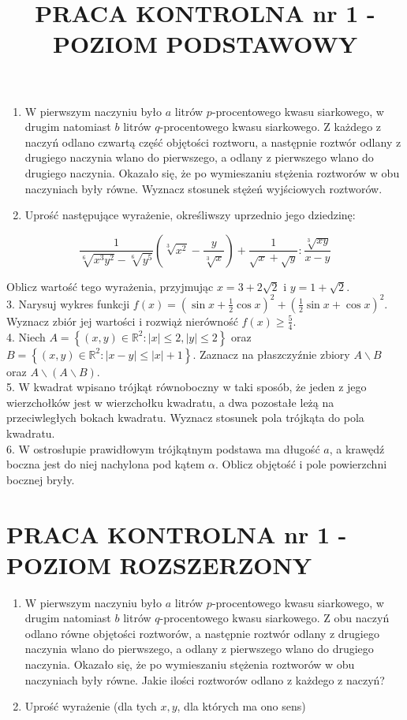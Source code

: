 \documentclass[10pt]{article}
\title{PRACA KONTROLNA nr 1 - POZIOM PODSTAWOWY }
\author{}
\date{}
\begin{document}
\maketitle
\begin{enumerate}
  \item W pierwszym naczyniu było $a$ litrów $p$-procentowego kwasu siarkowego, w drugim natomiast $b$ litrów $q$-procentowego kwasu siarkowego. Z każdego z naczyń odlano czwartą część objętości roztworu, a następnie roztwór odlany z drugiego naczynia wlano do pierwszego, a odlany z pierwszego wlano do drugiego naczynia. Okazało się, że po wymieszaniu stężenia roztworów w obu naczyniach były równe. Wyznacz stosunek stężeń wyjściowych roztworów.
  \item Uprość następujące wyrażenie, określiwszy uprzednio jego dziedzinę:
\end{enumerate}

$$
\frac{1}{\sqrt[6]{x^{3} y^{2}}-\sqrt[6]{y^{5}}}\left(\sqrt[3]{x^{2}}-\frac{y}{\sqrt[3]{x}}\right)+\frac{1}{\sqrt{x}+\sqrt{y}}: \frac{\sqrt[3]{x y}}{x-y}
$$

Oblicz wartość tego wyrażenia, przyjmując $x=3+2 \sqrt{2}$ i $y=1+\sqrt{2}$.\\
3. Narysuj wykres funkcji $f(x)=\left(\sin x+\frac{1}{2} \cos x\right)^{2}+\left(\frac{1}{2} \sin x+\cos x\right)^{2}$. Wyznacz zbiór jej wartości i rozwiąż nierówność $f(x) \geqslant \frac{5}{4}$.\\
4. Niech $A=\left\{(x, y) \in \mathbb{R}^{2}:|x| \leqslant 2,|y| \leqslant 2\right\}$ oraz $B=\left\{(x, y) \in \mathbb{R}^{2}:|x-y| \leqslant|x|+1\right\}$. Zaznacz na płaszczyźnie zbiory $A \backslash B$ oraz $A \backslash(A \backslash B)$.\\
5. W kwadrat wpisano trójkąt równoboczny w taki sposób, że jeden z jego wierzchołków jest w wierzchołku kwadratu, a dwa pozostałe leżą na przeciwległych bokach kwadratu. Wyznacz stosunek pola trójkąta do pola kwadratu.\\
6. W ostrosłupie prawidłowym trójkątnym podstawa ma długość $a$, a krawędź boczna jest do niej nachylona pod kątem $\alpha$. Oblicz objętość i pole powierzchni bocznej bryły.

\section*{PRACA KONTROLNA nr 1 - POZIOM ROZSZERZONY}
\begin{enumerate}
  \item W pierwszym naczyniu było $a$ litrów $p$-procentowego kwasu siarkowego, w drugim natomiast $b$ litrów $q$-procentowego kwasu siarkowego. Z obu naczyń odlano równe objętości roztworów, a następnie roztwór odlany z drugiego naczynia wlano do pierwszego, a odlany z pierwszego wlano do drugiego naczynia. Okazało się, że po wymieszaniu stężenia roztworów w obu naczyniach były równe. Jakie ilości roztworów odlano z każdego z naczyń?
  \item Uprość wyrażenie (dla tych $x, y$, dla których ma ono sens)
\end{enumerate}
\end{document}
